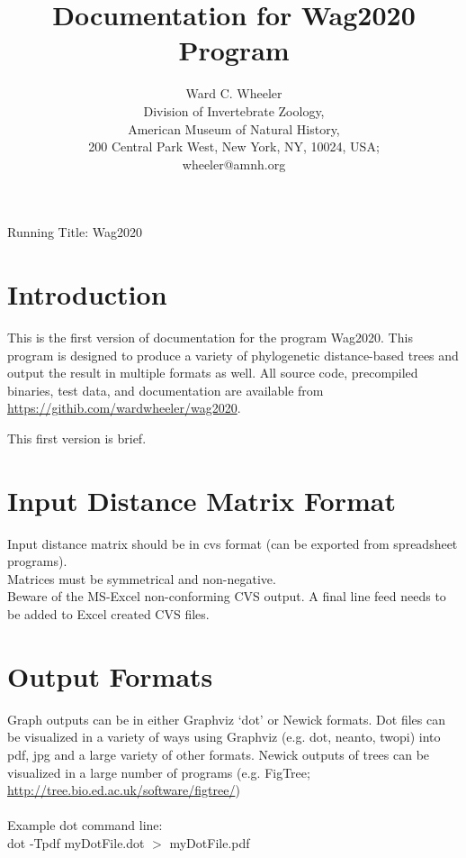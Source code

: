 \documentclass[11pt]{memoir}
\begin{document}
	
	\title{Documentation for Wag2020 Program}
	\author{Ward C. Wheeler\\
		Division of Invertebrate Zoology,\\ American Museum of Natural History,\\ 200 Central Park West, New York, NY, 10024, USA;\\wheeler@amnh.org}
	
	
	\maketitle
	\begin{center}
		Running Title: Wag2020
	\end{center}
	\newpage
	
	
	\section{Introduction}
	This is the first version of documentation for the program Wag2020.  This program is designed to produce a variety of 
	phylogenetic distance-based  trees and output the result in multiple formats as well.
	All source code, precompiled binaries, test data, and documentation are available from \url{https://githib.com/wardwheeler/wag2020}.
	
	This first version is brief.
	
	\section{Input Distance Matrix Format}
	Input distance matrix should be in cvs format (can be exported from spreadsheet programs).  \\
	
	\noindent Matrices must be symmetrical and non-negative.\\
	
	\noindent Beware of the MS-Excel
	non-conforming CVS output.  A final line feed needs to be added to Excel created CVS files.
	
	\section{Output Formats}
	Graph outputs can be in either Graphviz `dot' or Newick formats.  Dot files can be visualized in a variety of ways 
	using Graphviz (e.g. dot, neanto, twopi) into pdf, jpg and a large variety of other formats. Newick outputs of trees 
	can be visualized in a 
	large number of programs (e.g. FigTree; \url{http://tree.bio.ed.ac.uk/software/figtree/})\\ 
	\\
	Example dot command line: \\
		dot -Tpdf myDotFile.dot $>$ myDotFile.pdf\\
	
\end{document}
